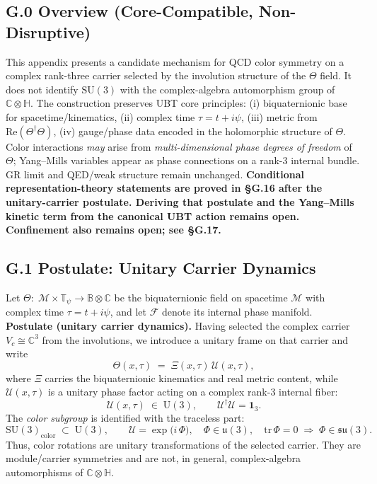 \subsection*{G.0 Overview (Core-Compatible, Non-Disruptive)}
This appendix presents a candidate mechanism for QCD color symmetry on a complex rank-three carrier selected by the involution structure of the $\Theta$ field.  It does not identify $\mathrm{SU}(3)$ with the complex-algebra automorphism group of $\mathbb{C}\otimes\mathbb{H}$. The construction preserves UBT core principles:
(i) biquaternionic base for spacetime/kinematics, 
(ii) complex time $\tau=t+i\psi$, 
(iii) metric from $\mathrm{Re}(\Theta^\dagger \Theta)$, 
(iv) gauge/phase data encoded in the holomorphic structure of $\Theta$.
Color interactions \emph{may} arise from \emph{multi-dimensional phase degrees of freedom} of $\Theta$; Yang–Mills variables appear as phase connections on a rank-3 internal bundle. GR limit and QED/weak structure remain unchanged.
\textbf{Conditional representation-theory statements are proved in \S G.16 after the unitary-carrier postulate.  Deriving that postulate and the Yang--Mills kinetic term from the canonical UBT action remains open.  Confinement also remains open; see \S G.17.}

\subsection*{G.1 Postulate: Unitary Carrier Dynamics}
Let $\Theta:\; \mathcal{M}\times \mathbb{T}_\psi \to \mathbb{B}\otimes \mathbb{C}$ be the biquaternionic field on spacetime $\mathcal{M}$ with complex time $\tau=t+i\psi$, 
and let $\mathcal{F}$ denote its internal phase manifold. 
\textbf{Postulate (unitary carrier dynamics).}  Having selected the complex carrier $V_c\cong\mathbb{C}^3$ from the involutions, we introduce a unitary frame on that carrier and write
\begin{equation}
\label{eq:G1_theta_factorization}
\Theta(x,\tau)\;=\; \Xi(x,\tau)\,\mathcal{U}(x,\tau),
\end{equation}
where $\Xi$ carries the biquaternionic kinematics and real metric content, while 
$\mathcal{U}(x,\tau)$ is a unitary phase factor acting on a complex rank-$3$ internal fiber:
\begin{equation}
\mathcal{U}(x,\tau)\;\in\;\mathrm{U}(3), 
\qquad \mathcal{U}^\dagger\mathcal{U}=\mathbf{1}_3.
\end{equation}
The \emph{color subgroup} is identified with the traceless part:
\begin{equation}
\label{eq:G1_su3_subgroup}
\mathrm{SU}(3)_{\text{color}}\;\subset\;\mathrm{U}(3), 
\qquad \mathcal{U}=\exp\big(i\,\Phi\big),\quad \Phi\in \mathfrak{u}(3), \quad \mathrm{tr}\,\Phi=0 \;\Rightarrow\; \Phi\in \mathfrak{su}(3).
\end{equation}
Thus, color rotations are unitary transformations of the selected carrier.  They are module/carrier symmetries and are not, in general, complex-algebra automorphisms of $\mathbb{C}\otimes\mathbb{H}$.


